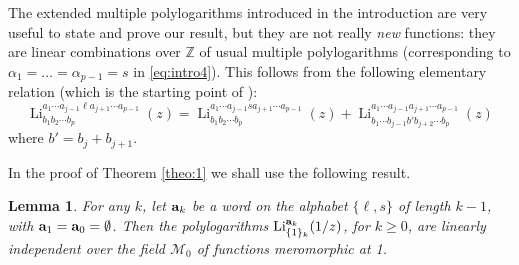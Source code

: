 \documentclass[reqno,12pt]{amsart}
\numberwithin{equation}{section}
\newtheorem{lem}{Lemma}
\theoremstyle{remark}
\def\li{\operatorname{Li}}
\newcommand{\Z}{\mathbb{Z}}
\newcommand{\mzero}{\mathcal{M}_0}
\begin{document}
The extended multiple po\-lylogarithms introduced in  the introduction are very useful to 
state and prove our result, but they are not really {\em new} functions: they are linear 
combinations over $\Z$ of usual multiple polylogarithms (corresponding to $\alpha_1 
= \ldots = \alpha_{p-1} =  s$ in \eqref{eq:intro4}). This follows from the following 
elementary relation (which is the starting point of \cite{crefiri}):
\begin{equation} \label{eqdeplin}
\li_{b_1b_2\cdots b_p}^{a_1 \cdots a_{j-1} \ell a_{j+1} \cdots  a_{p-1}}(z) =
 \li_{b_1b_2\cdots b_p}^{a_1 \cdots a_{j-1} s a_{j+1} \cdots  a_{p-1}}(z)  
+  \li_{b_1 \cdots b_{j-1} b' b_{j+2} \cdots  b_p}^{a_1 \cdots a_{j-1}   a_{j+1} \cdots  a_{p-1}}(z)  
\end{equation} 
where $b' = b_j + b_{j+1}$.

In the proof of Theorem \ref{theo:1} we shall use the following result.

\begin{lem} \label{lemmerom} For any $k$, let ${\bf a}_k$ be a word on the alphabet 
$\{\ell,s\}$ of length $k-1$, with ${\bf a}_1 = {\bf a}_0 = \emptyset$. Then the  
polylogarithms $\li_{\{1\}_k}^{ {\bf a}_k}(1/z)$, for $k\geq 0$, are linearly independent 
over the field $\mzero$ of functions meromorphic at 1.
\end{lem}
\end{document}
